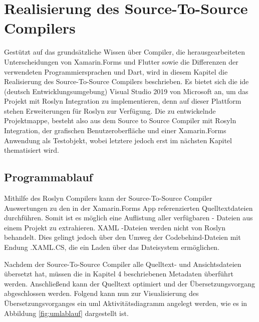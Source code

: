 \chapter{Realisierung des Source-To-Source Compilers}
\label{chap:Realisierung}
Gestützt auf das grundsätzliche Wissen über Compiler, die herausgearbeiteten Unterscheidungen von  Xamarin.Forms und Flutter sowie die Differenzen der verwendeten Programmiersprachen  \Csharp und Dart, wird in diesem Kapitel die Realisierung des Source-To-Source Compilers beschrieben.  Es bietet sich die \ac{ide} (deutsch Entwicklungsumgebung) Visual Studio 2019 von Microsoft an,  um das Projekt mit Roslyn Integration zu implementieren,  denn auf dieser Plattform stehen Erweiterungen für Roslyn zur Verfügung.
Die zu entwickelnde Projektmappe,  besteht also aus dem Source to Source Compiler mit Rosyln Integration, der grafischen Benutzeroberfläche und einer Xamarin.Forms
Anwendung als Testobjekt,  wobei letztere jedoch erst im nächsten Kapitel thematisiert wird.


\section{Programmablauf}
Mithilfe des Roslyn Compilers kann der Source-To-Source Compiler Auswertungen zu den in der Xamarin.Forms App referenzierten Quelltextdateien durchführen.  Somit ist es
möglich eine Auflistung aller verfügbaren \Csharp - Dateien aus einem Projekt zu extrahieren.  XAML -Dateien werden nicht von Roslyn behandelt.  Dies gelingt jedoch über den Umweg der Codebehind-Dateien mit Endung .XAML.CS,  die ein Laden über das Dateisystem ermöglichen. 

Nachdem der Source-To-Source Compiler alle Quelltext- und Ansichtsdateien übersetzt hat,  müssen die in Kapitel 4 beschriebenen Metadaten überführt werden.  Anschließend kann der Quelltext optimiert und der Übersetzungsvorgang abgeschlossen werden.  Folgend kann nun zur Visualisierung des Übersetzungsvorganges ein \ac{uml}  Aktivitätsdiagramm angelegt werden, wie es in Abbildung \ref{fig:umlablauf} dargestellt ist.

